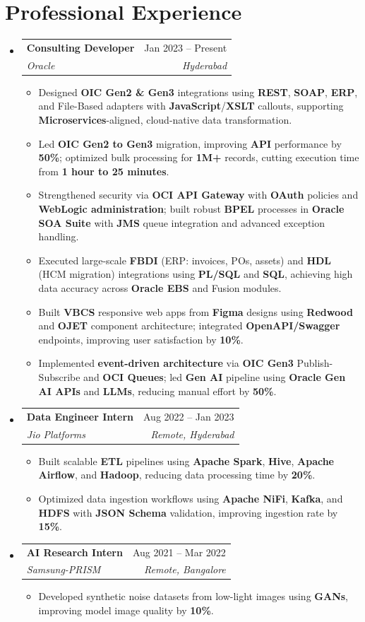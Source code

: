 \documentclass[letterpaper,11pt]{article}
\makeatletter
\newcommand{\resumeItem}[1]{
  \item\small{
    {#1 \vspace{-2pt}}
  }
}
\newcommand{\resumeSubheading}[4]{
  \vspace{-2pt}\item
    \begin{tabular*}{0.97\textwidth}[t]{l@{\extracolsep{\fill}}r}
      \textbf{#1} & #2 \\
      \textit{\small#3} & \textit{\small #4} \\
    \end{tabular*}\vspace{-7pt}
}
\newcommand{\resumeSubHeadingListStart}{\begin{itemize}[leftmargin=0.15in, label={}]}
\newcommand{\resumeSubHeadingListEnd}{\end{itemize}}
\newcommand{\resumeItemListStart}{\begin{itemize}}
\newcommand{\resumeItemListEnd}{\end{itemize}\vspace{-5pt}}
\makeatother
\begin{document}
\section{Professional Experience}
\resumeSubHeadingListStart
    \resumeSubheading
      {Consulting Developer}{Jan 2023 -- Present}
      {Oracle}{Hyderabad}
      \resumeItemListStart
        \resumeItem{Designed \textbf{OIC Gen2 \& Gen3} integrations using \textbf{REST}, \textbf{SOAP}, \textbf{ERP}, and File-Based adapters with \textbf{JavaScript}/\textbf{XSLT} callouts, supporting \textbf{Microservices}-aligned, cloud-native data transformation.}
        \resumeItem{Led \textbf{OIC Gen2 to Gen3} migration, improving \textbf{API} performance by \textbf{50\%}; optimized bulk processing for \textbf{1M+} records, cutting execution time from \textbf{1 hour to 25 minutes}.}
        \resumeItem{Strengthened security via \textbf{OCI API Gateway} with \textbf{OAuth} policies and \textbf{WebLogic administration}; built robust \textbf{BPEL} processes in \textbf{Oracle SOA Suite} with \textbf{JMS} queue integration and advanced exception handling.}
        \resumeItem{Executed large-scale \textbf{FBDI} (ERP: invoices, POs, assets) and \textbf{HDL} (HCM migration) integrations using \textbf{PL/SQL} and \textbf{SQL}, achieving high data accuracy across \textbf{Oracle EBS} and Fusion modules.}
        \resumeItem{Built \textbf{VBCS} responsive web apps from \textbf{Figma} designs using \textbf{Redwood} and \textbf{OJET} component architecture; integrated \textbf{OpenAPI/Swagger} endpoints, improving user satisfaction by \textbf{10\%}.}
        \resumeItem{Implemented \textbf{event-driven architecture} via \textbf{OIC Gen3} Publish-Subscribe and \textbf{OCI Queues}; led \textbf{Gen AI} pipeline using \textbf{Oracle Gen AI APIs} and \textbf{LLMs}, reducing manual effort by \textbf{50\%}.}
      \resumeItemListEnd
    \resumeSubheading
      {Data Engineer Intern}{Aug 2022 -- Jan 2023}
      {Jio Platforms}{Remote, Hyderabad}
      \resumeItemListStart
        \resumeItem{Built scalable \textbf{ETL} pipelines using \textbf{Apache Spark}, \textbf{Hive}, \textbf{Apache Airflow}, and \textbf{Hadoop}, reducing data processing time by \textbf{20\%}.}
        \resumeItem{Optimized data ingestion workflows using \textbf{Apache NiFi}, \textbf{Kafka}, and \textbf{HDFS} with \textbf{JSON Schema} validation, improving ingestion rate by \textbf{15\%}.}
      \resumeItemListEnd
    \resumeSubheading
      {AI Research Intern}{Aug 2021 -- Mar 2022}
      {Samsung-PRISM}{Remote, Bangalore}
      \resumeItemListStart
        \resumeItem{Developed synthetic noise datasets from low-light images using \textbf{GANs}, improving model image quality by \textbf{10\%}.}
      \resumeItemListEnd
\resumeSubHeadingListEnd
\end{document}
